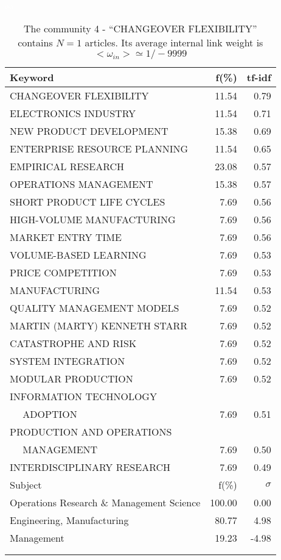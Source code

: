 \documentclass[a4paper,11pt]{report}
\begin{document}
\begin{landscape}
\clearpage

\begin{table}[!ht]
\caption{The community 4 - ``CHANGEOVER FLEXIBILITY'' contains $N = 1$ articles. Its average internal link weight is $<\omega_{in}> \simeq 1/-9999$ }
\textcolor{white}{aa}\\
{\scriptsize\begin{tabular}{|l r  r|}
\hline
Keyword & f(\%) & tf-idf \\
\hline
CHANGEOVER FLEXIBILITY & 11.54 & 0.79\\
ELECTRONICS INDUSTRY & 11.54 & 0.71\\
NEW PRODUCT DEVELOPMENT & 15.38 & 0.69\\
ENTERPRISE RESOURCE PLANNING & 11.54 & 0.65\\
EMPIRICAL RESEARCH & 23.08 & 0.57\\
OPERATIONS MANAGEMENT & 15.38 & 0.57\\
SHORT PRODUCT LIFE CYCLES & 7.69 & 0.56\\
HIGH-VOLUME MANUFACTURING & 7.69 & 0.56\\
MARKET ENTRY TIME & 7.69 & 0.56\\
VOLUME-BASED LEARNING & 7.69 & 0.53\\
PRICE COMPETITION & 7.69 & 0.53\\
MANUFACTURING & 11.54 & 0.53\\
QUALITY MANAGEMENT MODELS & 7.69 & 0.52\\
MARTIN (MARTY) KENNETH STARR & 7.69 & 0.52\\
CATASTROPHE AND RISK & 7.69 & 0.52\\
SYSTEM INTEGRATION & 7.69 & 0.52\\
MODULAR PRODUCTION & 7.69 & 0.52\\
INFORMATION TECHNOLOGY &  &\\
$\quad$ ADOPTION & 7.69 & 0.51\\
PRODUCTION AND OPERATIONS &  &\\
$\quad$ MANAGEMENT & 7.69 & 0.50\\
INTERDISCIPLINARY RESEARCH & 7.69 & 0.49\\
\hline
\hline
Subject & f(\%) & $\sigma$\\
\hline
Operations Research \& Management Science & 100.00 & 0.00\\
Engineering, Manufacturing & 80.77 & 4.98\\
Management & 19.23 & -4.98\\
 &  & \\
 &  & \\

\end{tabular}}
\end{table}
\end{landscape}
\end{document}
